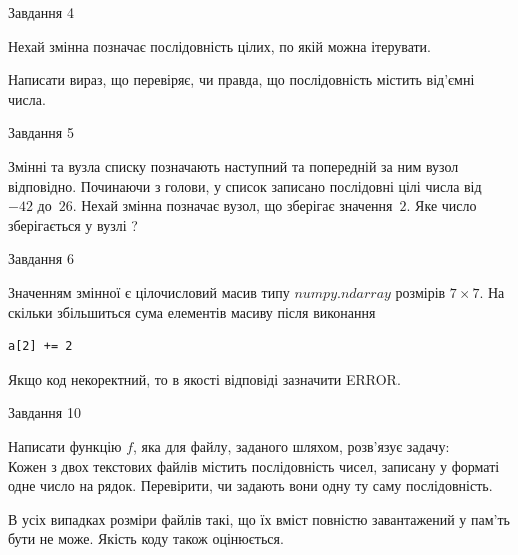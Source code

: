 \documentclass[12pt, ukrainian]{article}
\begin{document}
{\begin{minipage}[t]{8.0cm}
\end{minipage}


               
{\begin{center}Завдання {4}\end{center}}
\vspace{-4mm}
Нехай змінна  позначає послідовність цілих, по якій можна ітерувати.

Написати вираз, що перевіряє, чи правда, що послідовність  містить від’ємні числа.\par

\vspace{10mm}
               
{\begin{center}Завдання {5}\end{center}}
\vspace{-4mm}
Змінні  та  вузла списку позначають наступний та попередній за ним вузол відповідно. Починаючи з голови, у список записано послідовні цілі числа від~$-42$ до~$26$. Нехай змінна  позначає вузол, що зберігає значення~$2$.
Яке число зберігається у вузлі  ?\par

               
{\begin{center}Завдання {6}\end{center}}
\vspace{-4mm}
Значенням змінної  є цілочисловий масив типу $numpy.ndarray$ розмірів $7{\times}7$. На скільки збільшиться сума елементів масиву  після виконання
\begin{verbatim}
a[2] += 2
\end{verbatim}


Якщо код некоректний, то в якості відповіді зазначити ERROR.\par

               
{\begin{center}Завдання {10}\end{center}}
\vspace{-4mm}

Написати функцію $f$, яка для файлу, заданого шляхом, розв’язує задачу:\\ Кожен з двох текстових файлів містить послідовність чисел, записану у форматі одне число на рядок.  Перевірити, чи задають вони одну ту саму послідовність.

В усіх випадках розміри файлів такі, що їх вміст повністю завантажений у пам'ть бути не може. Якість коду також оцінюється.



}
\end{document}

